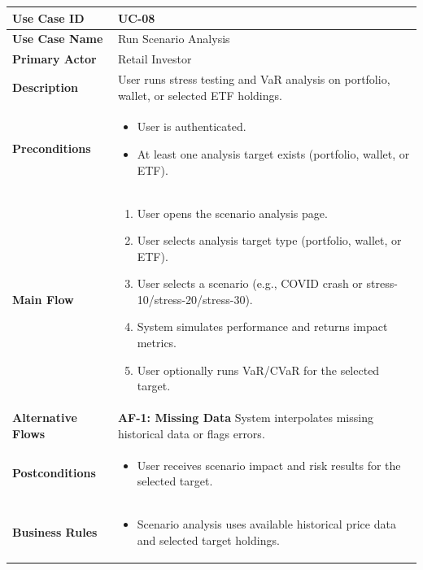 \begin{longtable}{|>{\raggedright\arraybackslash\bfseries}p{3.5cm}|p{11cm}|}
\hline
\rowcolor{gray!15} Use Case ID & UC-08 \\ \hline
Use Case Name & Run Scenario Analysis \\ \hline
Primary Actor & Retail Investor \\ \hline
Description & User runs stress testing and VaR analysis on portfolio, wallet, or selected ETF holdings. \\ \hline
Preconditions &
\begin{itemize}[leftmargin=*, nosep]
    \item User is authenticated.
    \item At least one analysis target exists (portfolio, wallet, or ETF).
\end{itemize} \\ \hline
Main Flow &
\begin{enumerate}[leftmargin=*, nosep]
    \item User opens the scenario analysis page.
    \item User selects analysis target type (portfolio, wallet, or ETF).
    \item User selects a scenario (e.g., COVID crash or stress-10/stress-20/stress-30).
    \item System simulates performance and returns impact metrics.
    \item User optionally runs VaR/CVaR for the selected target.
\end{enumerate} \\ \hline
Alternative Flows &
\textbf{AF-1: Missing Data} \newline
System interpolates missing historical data or flags errors. \\ \hline
Postconditions &
\begin{itemize}[leftmargin=*, nosep]
    \item User receives scenario impact and risk results for the selected target.
\end{itemize} \\ \hline
Business Rules &
\begin{itemize}[leftmargin=*, nosep]
    \item Scenario analysis uses available historical price data and selected target holdings.
\end{itemize} \\ \hline
\end{longtable}

